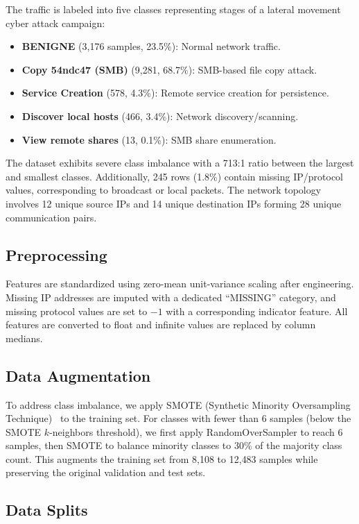 \documentclass[conference]{IEEEtran}
\begin{document}
The traffic is labeled into five classes representing stages of a lateral movement cyber attack campaign:
\begin{itemize}
    \item \textbf{BENIGNE} (3{,}176 samples, 23.5\%): Normal network traffic.
    \item \textbf{Copy 54ndc47 (SMB)} (9{,}281, 68.7\%): SMB-based file copy attack.
    \item \textbf{Service Creation} (578, 4.3\%): Remote service creation for persistence.
    \item \textbf{Discover local hosts} (466, 3.4\%): Network discovery/scanning.
    \item \textbf{View remote shares} (13, 0.1\%): SMB share enumeration.
\end{itemize}

The dataset exhibits severe class imbalance with a 713:1 ratio between the largest and smallest classes. Additionally, 245 rows (1.8\%) contain missing IP/protocol values, corresponding to broadcast or local packets. The network topology involves 12 unique source IPs and 14 unique destination IPs forming 28 unique communication pairs.

\subsection{Preprocessing}

Features are standardized using zero-mean unit-variance scaling after engineering. Missing IP addresses are imputed with a dedicated ``MISSING'' category, and missing protocol values are set to $-1$ with a corresponding indicator feature. All features are converted to float and infinite values are replaced by column medians.

\subsection{Data Augmentation}

To address class imbalance, we apply SMOTE (Synthetic Minority Oversampling Technique)~\cite{chawla2002smote} to the training set. For classes with fewer than 6 samples (below the SMOTE $k$-neighbors threshold), we first apply RandomOverSampler to reach 6 samples, then SMOTE to balance minority classes to 30\% of the majority class count. This augments the training set from 8{,}108 to 12{,}483 samples while preserving the original validation and test sets.

\subsection{Data Splits}
\end{document}
